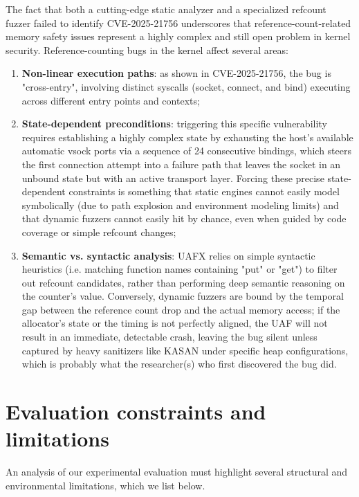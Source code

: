 The fact that both a cutting-edge static analyzer and a specialized refcount fuzzer failed to identify CVE-2025-21756 underscores that reference-count-related memory safety issues represent a highly complex and still open problem in kernel security. Reference-counting bugs in the kernel affect several areas:

\begin{enumerate}
    \item \textbf{Non-linear execution paths}: as shown in CVE-2025-21756, the bug is "cross-entry", involving distinct syscalls (socket, connect, and bind) executing across different entry points and contexts;

    \item \textbf{State-dependent preconditions}: triggering this specific vulnerability requires establishing a highly complex state by exhausting the host's available automatic vsock ports via a sequence of 24 consecutive bindings, which steers the first connection attempt into a failure path that leaves the socket in an unbound state but with an active transport layer. Forcing these precise state-dependent constraints is something that static engines cannot easily model symbolically (due to path explosion and environment modeling limits) and that dynamic fuzzers cannot easily hit by chance, even when guided by code coverage or simple refcount changes;

    \item \textbf{Semantic vs. syntactic analysis}: UAFX relies on simple syntactic heuristics (i.e. matching function names containing "put" or "get") to filter out refcount candidates, rather than performing deep semantic reasoning on the counter's value. Conversely, dynamic fuzzers are bound by the temporal gap between the reference count drop and the actual memory access; if the allocator's state or the timing is not perfectly aligned, the UAF will not result in an immediate, detectable crash, leaving the bug silent unless captured by heavy sanitizers like KASAN under specific heap configurations, which is probably what the researcher(s) who first discovered the bug did.
\end{enumerate}

\section{Evaluation constraints and limitations}
An analysis of our experimental evaluation must highlight several structural and environmental limitations, which we list below.

